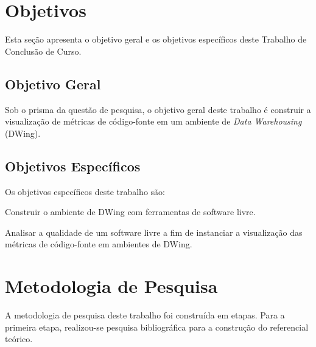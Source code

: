 
\section{Objetivos}

Esta seção apresenta o objetivo geral e os objetivos específicos deste Trabalho de Conclusão de Curso.

\subsection{Objetivo Geral}
Sob o prisma da questão de pesquisa, o objetivo geral deste trabalho é construir a visualização de métricas de código-fonte em um ambiente de \textit{Data Warehousing} (DWing).


\subsection{Objetivos Específicos}

Os objetivos específicos deste trabalho são:


\begin{objectives}

	\item Construir o ambiente de DWing com ferramentas de software livre.

	\item Analisar a qualidade de um software livre a fim de instanciar a visualização das métricas de código-fonte em ambientes de DWing.
	
    \end{objectives}
	



\section {Metodologia de Pesquisa}

A metodologia de pesquisa deste trabalho foi construída em etapas. Para a primeira etapa, realizou-se pesquisa bibliográfica para a construção do referencial teórico. 

